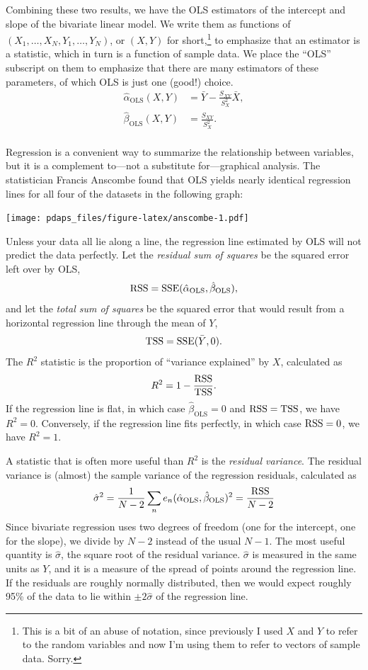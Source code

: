 \documentclass[
  12pt,
  oneside,openany]{book}
\begin{document}
Combining these two results, we have the OLS estimators of the intercept and slope of the bivariate linear model. We write them as functions of \((X_1, \ldots, X_N, Y_1, \ldots, Y_N)\), or \((X, Y)\) for short,\footnote{This is a bit of an abuse of notation, since previously I used \(X\) and \(Y\) to refer to the random variables and now I'm using them to refer to vectors of sample data. Sorry.} to emphasize that an estimator is a statistic, which in turn is a function of sample data. We place the ``OLS'' subscript on them to emphasize that there are many estimators of these parameters, of which OLS is just one (good!) choice.
\[
\begin{aligned}
\hat{\alpha}_{\text{OLS}}(X, Y)
&= \bar{Y} - \frac{S_{XY}}{S_X^2} \bar{X}, \\
\hat{\beta}_{\text{OLS}}(X, Y)
&= \frac{S_{XY}}{S_X^2}. \\
\end{aligned}
\]

Regression is a convenient way to summarize the relationship between variables, but it is a complement to---not a substitute for---graphical analysis. The statistician Francis Anscombe found that OLS yields nearly identical regression lines for all four of the datasets in the following graph:

\texttt{[image: pdaps\_files/figure-latex/anscombe-1.pdf]}

Unless your data all lie along a line, the regression line estimated by OLS will not predict the data perfectly. Let the \emph{residual sum of squares} be the squared error left over by OLS,
\[
\mathop{\rm RSS}\nolimits= \mathop{\rm SSE}\nolimits(\hat{\alpha}_{\text{OLS}}, \hat{\beta}_{\text{OLS}}),
\]
and let the \emph{total sum of squares} be the squared error that would result from a horizontal regression line through the mean of \(Y\),
\[
\mathop{\rm TSS}\nolimits= \mathop{\rm SSE}\nolimits(\bar{Y}, 0).
\]
The \(R^2\) statistic is the proportion of ``variance explained'' by \(X\), calculated as
\[
R^2 = 1 - \frac{\mathop{\rm RSS}\nolimits}{\mathop{\rm TSS}\nolimits}.
\]
If the regression line is flat, in which case \(\hat{\beta}_{\text{OLS}} = 0\) and \(\mathop{\rm RSS}\nolimits= \mathop{\rm TSS}\nolimits\), we have \(R^2= 0\). Conversely, if the regression line fits perfectly, in which case \(\mathop{\rm RSS}\nolimits= 0\), we have \(R^2 = 1\).

A statistic that is often more useful than \(R^2\) is the \emph{residual variance}. The residual variance is (almost) the sample variance of the regression residuals, calculated as
\[
\hat{\sigma}^2
= \frac{1}{N - 2} \sum_n e_n(\hat{\alpha}_{\text{OLS}}, \hat{\beta}_{\text{OLS}})^2
= \frac{\mathop{\rm RSS}\nolimits}{N - 2}
\]
Since bivariate regression uses two degrees of freedom (one for the intercept, one for the slope), we divide by \(N - 2\) instead of the usual \(N - 1\). The most useful quantity is \(\hat{\sigma}\), the square root of the residual variance. \(\hat{\sigma}\) is measured in the same units as \(Y\), and it is a measure of the spread of points around the regression line. If the residuals are roughly normally distributed, then we would expect roughly 95\% of the data to lie within \(\pm 2 \hat{\sigma}\) of the regression line.
\end{document}
